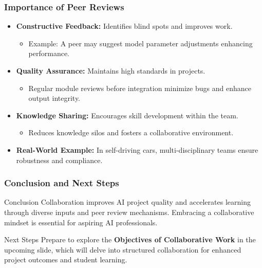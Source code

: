 \documentclass{beamer}
\begin{document}
\begin{frame}[fragile]
    \frametitle{Importance of Peer Reviews}
    
    \begin{itemize}
        \item \textbf{Constructive Feedback:} Identifies blind spots and improves work.
        \begin{itemize}
            \item Example: A peer may suggest model parameter adjustments enhancing performance.
        \end{itemize}
        
        \item \textbf{Quality Assurance:} Maintains high standards in projects.
        \begin{itemize}
            \item Regular module reviews before integration minimize bugs and enhance output integrity.
        \end{itemize}
        
        \item \textbf{Knowledge Sharing:} Encourages skill development within the team.
        \begin{itemize}
            \item Reduces knowledge silos and fosters a collaborative environment.
        \end{itemize}
        
        \item \textbf{Real-World Example:} In self-driving cars, multi-disciplinary teams ensure robustness and compliance.
    \end{itemize}
\end{frame}

\begin{frame}[fragile]
    \frametitle{Conclusion and Next Steps}

    \begin{block}{Conclusion}
        Collaboration improves AI project quality and accelerates learning through diverse inputs and peer review mechanisms. Embracing a collaborative mindset is essential for aspiring AI professionals.
    \end{block}

    \begin{block}{Next Steps}
        Prepare to explore the \textbf{Objectives of Collaborative Work} in the upcoming slide, which will delve into structured collaboration for enhanced project outcomes and student learning.
    \end{block}
\end{frame}
\end{document}

